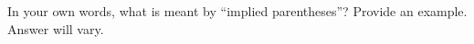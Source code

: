 {In your own words, what is meant by ``implied parentheses''? Provide an example.}
{Answer will vary.}
